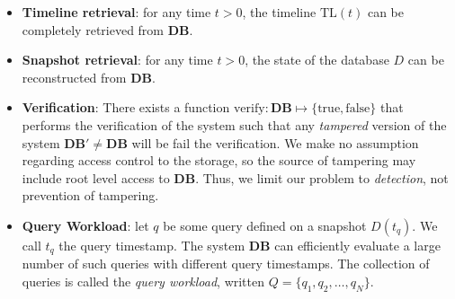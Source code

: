 \begin{itemize}
    \item {\bf Timeline retrieval}: for any time $t > 0$, the timeline
        $\mathrm{TL}(t)$ can be completely retrieved from $\mathbf{DB}$.
    \item {\bf Snapshot retrieval}: for any time $t > 0$, the state of the
        database $D$ can be reconstructed from $\mathbf{DB}$.
    \item {\bf Verification}: There exists a function
        $\mathrm{verify}:\mathbf{DB}\mapsto\{\mathrm{true},\mathrm{false}\}$
        that performs the verification of the system such that
        any {\em tampered} version of the system $\mathbf{DB}'\not=\mathbf{DB}$
        will be fail the verification.  We make no assumption regarding access
        control to the storage,
        so the source of tampering may include root level access to
        $\mathbf{DB}$.  Thus, we limit our problem to {\em detection}, not
        prevention of tampering.
    \item {\bf Query Workload}: let $q$ be some query defined on a snapshot
        $D(t_q)$.  We call $t_q$ the query timestamp.  The system $\mathbf{DB}$
        can efficiently evaluate a large number of such queries with different
        query timestamps.  The collection of queries is called the {\em query
        workload}, written $Q = \{q_1, q_2, \dots, q_N\}$.
\end{itemize}
